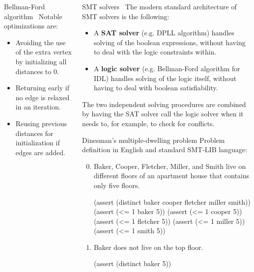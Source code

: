 \documentclass{beamer}
\begin{document}
\begin{frame}[fragile,t]
\begin{columns}[t,onlytextwidth]
\begin{column}{0.485\textwidth}
\begin{block}{Bellman-Ford algorithm~\cite{CLRS}}
			Notable optimizations are:
			\begin{itemize}
				\item Avoiding the use of the extra vertex by initializing all distances to 0.
				\item Returning early if no edge is relaxed in an iteration.
				\item Reusing previous distances for initialization if edges are added.
			\end{itemize}
		\end{block}
	\end{column}

	\begin{column}{0.485\textwidth}
		\begin{block}{SMT solvers~\cite{slides}}
			The modern standard architecture of SMT solvers is the following:
			\begin{itemize}
				\item A \textbf{SAT solver} (e.g. DPLL algorithm) handles solving of the boolean expressions, without having to deal with the logic constraints within.
				\item A \textbf{logic solver} (e.g. Bellman-Ford algorithm for IDL) handles solving of the logic itself, without having to deal with boolean satisfiability.
			\end{itemize}
			The two independent solving procedures are combined by having the SAT solver call the logic solver when it needs to, for example, to check for conflicts.
		\end{block}
	
		\begin{block}{Dinesman's multiple-dwelling problem} %
			Problem definition in English and standard SMT-LIB language:
			\begin{enumerate}
				\setcounter{enumi}{-1} %
				
				\item Baker, Cooper, Fletcher, Miller, and Smith live on different floors of an apartment house that contains only five floors.
				\begin{smtlib}
					(assert (distinct baker cooper fletcher miller smith))
					(assert (<= 1 baker 5))
					(assert (<= 1 cooper 5))
					(assert (<= 1 fletcher 5))
					(assert (<= 1 miller 5))
					(assert (<= 1 smith 5))
				\end{smtlib}
				
				\item Baker does not live on the top floor.
				\begin{smtlib}
					(assert (distinct baker 5))
				\end{smtlib}
			

\end{enumerate}
\end{block}
\end{column}
\end{columns}
\end{frame}
\end{document}
